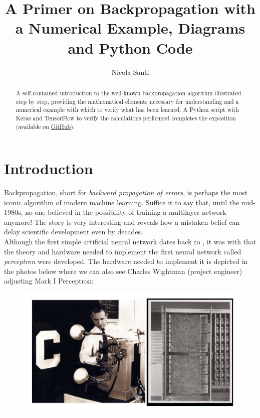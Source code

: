 \documentclass{article}
\title{A Primer on Backpropagation with a Numerical Example, Diagrams and Python Code }
\author{Nicola Santi}
\begin{document}
\maketitle

\begin{abstract}
A self-contained introduction to the well-known backpropagation algorithm illustrated step by step, providing the mathematical elements necessary for understanding and a numerical example with which to verify what has been learned. A Python script with Keras and TensorFlow to verify the calculations performed completes the exposition (available on \href{https://github.com/nicolinux72/backpropagation.git}{GitHub}).

\end{abstract}

\section{Introduction}
Backpropagation, short for \textit{backward propagation of errors}, is perhaps the most iconic algorithm of modern machine learning. Suffice it to say that, until the mid-1980s, no one believed in the possibility of training a multilayer network anymore! The story is very interesting and reveals how a mistaken belief can delay scientific development even by decades. \\

Although the first simple artificial neural network dates back to \textcite{mcculloch43a}, it was with \textcite{rosenblatt1962principles} that the theory and hardware needed to implement the first neural network called \textit{perceptron} were developed. The hardware needed to implement it is depicted in the photos below where we can also see Charles Wightman (project engineer) adjusting Mark I Perceptron:

\begin{figure}[H]
    \centering
    \includegraphics[width=0.8\linewidth]{images/perceptron.png}
\end{figure}
\end{document}
